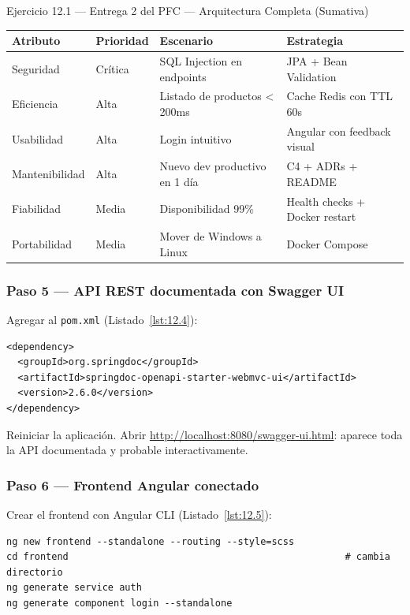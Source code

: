 \documentclass[11pt,a4paper,openany]{book}
\begin{document}
\begin{cajaejercicio}{Ejercicio 12.1 --- Entrega 2 del PFC --- Arquitectura Completa (Sumativa)}
\begin{tabularx}{\textwidth}{llXX}
\toprule
\textbf{Atributo} & \textbf{Prioridad} & \textbf{Escenario} & \textbf{Estrategia}\\
\midrule
Seguridad & Crítica & SQL Injection en endpoints & JPA + Bean Validation\\
Eficiencia & Alta & Listado de productos < 200ms & Cache Redis con TTL 60s\\
Usabilidad & Alta & Login intuitivo & Angular con feedback visual\\
Mantenibilidad & Alta & Nuevo dev productivo en 1 día & C4 + ADRs + README\\
Fiabilidad & Media & Disponibilidad 99\% & Health checks + Docker restart\\
Portabilidad & Media & Mover de Windows a Linux & Docker Compose\\
\bottomrule
\end{tabularx}

\subsubsection*{Paso 5 --- API REST documentada con Swagger UI}

Agregar al \texttt{pom.xml} (Listado~\ref{lst:12.4}):

\begin{lstlisting}[style=xml,numbers=none,caption={Ejemplo de XML},label=lst:12.4]
<dependency>
  <groupId>org.springdoc</groupId>
  <artifactId>springdoc-openapi-starter-webmvc-ui</artifactId>
  <version>2.6.0</version>
</dependency>
\end{lstlisting}

Reiniciar la aplicación. Abrir
\url{http://localhost:8080/swagger-ui.html}: aparece toda la API
documentada y probable interactivamente.

\subsubsection*{Paso 6 --- Frontend Angular conectado}

Crear el frontend con Angular CLI (Listado~\ref{lst:12.5}):
\begin{lstlisting}[style=shell,numbers=none,caption={Ejemplo de Shell},label=lst:12.5]
ng new frontend --standalone --routing --style=scss
cd frontend                                                 # cambia directorio
ng generate service auth
ng generate component login --standalone
\end{lstlisting}


\end{cajaejercicio}
\end{document}
